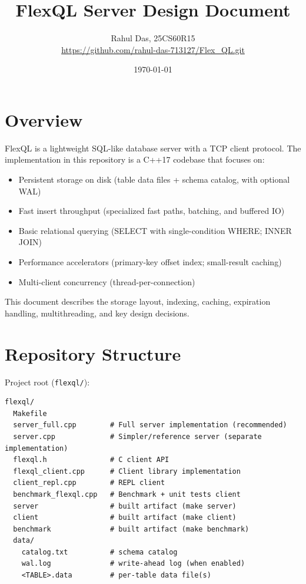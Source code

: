 \documentclass[11pt]{article}
\title{FlexQL Server Design Document}
\author{Rahul Das, 25CS60R15 \\ \url{https://github.com/rahul-das-713127/Flex_QL.git}}
\date{\today}
\begin{document}
\maketitle

\tableofcontents
\newpage

\section{Overview}
FlexQL is a lightweight SQL-like database server with a TCP client protocol. The implementation in this repository is a C++17 codebase that focuses on:

\begin{itemize}[leftmargin=*]
\item Persistent storage on disk (table data files + schema catalog, with optional WAL)
\item Fast insert throughput (specialized fast paths, batching, and buffered IO)
\item Basic relational querying (SELECT with single-condition WHERE; INNER JOIN)
\item Performance accelerators (primary-key offset index; small-result caching)
\item Multi-client concurrency (thread-per-connection)
\end{itemize}

This document describes the storage layout, indexing, caching, expiration handling, multithreading, and key design decisions.

\section{Repository Structure}
Project root (\texttt{flexql/}):

\begin{lstlisting}[basicstyle=\ttfamily\small]
flexql/
  Makefile
  server_full.cpp        # Full server implementation (recommended)
  server.cpp             # Simpler/reference server (separate implementation)
  flexql.h               # C client API
  flexql_client.cpp      # Client library implementation
  client_repl.cpp        # REPL client
  benchmark_flexql.cpp   # Benchmark + unit tests client
  server                 # built artifact (make server)
  client                 # built artifact (make client)
  benchmark              # built artifact (make benchmark)
  data/
    catalog.txt          # schema catalog
    wal.log              # write-ahead log (when enabled)
    <TABLE>.data         # per-table data file(s)
\end{lstlisting}
\end{document}
